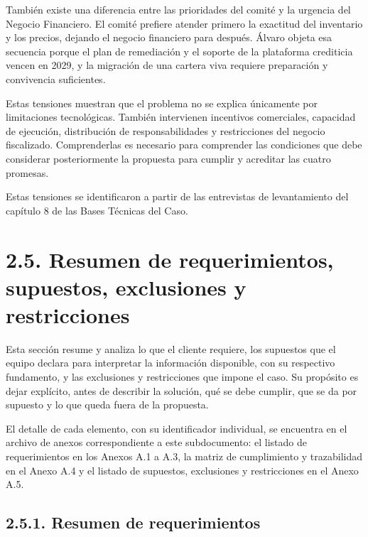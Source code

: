\documentclass[11pt]{article}
\begin{document}
También existe una diferencia entre las prioridades del comité y la urgencia del Negocio Financiero. El comité prefiere atender primero la exactitud del inventario y los precios, dejando el negocio financiero para después. Álvaro objeta esa secuencia porque el plan de remediación y el soporte de la plataforma crediticia vencen en 2029, y la migración de una cartera viva requiere preparación y convivencia suficientes.

Estas tensiones muestran que el problema no se explica únicamente por limitaciones tecnológicas. También intervienen incentivos comerciales, capacidad de ejecución, distribución de responsabilidades y restricciones del negocio fiscalizado. Comprenderlas es necesario para comprender las condiciones que debe considerar posteriormente la propuesta para cumplir y acreditar las cuatro promesas.

Estas tensiones se identificaron a partir de las entrevistas de levantamiento del capítulo 8 de las Bases Técnicas del Caso.

\section{2.5. Resumen de requerimientos, supuestos, exclusiones y restricciones}\label{resumen-de-requerimientos-supuestos-exclusiones-y-restricciones}

Esta sección resume y analiza lo que el cliente requiere, los supuestos que el equipo declara para interpretar la información disponible, con su respectivo fundamento, y las exclusiones y restricciones que impone el caso. Su propósito es dejar explícito, antes de describir la solución, qué se debe cumplir, que se da por supuesto y lo que queda fuera de la propuesta. 

El detalle de cada elemento, con su identificador individual, se encuentra en el archivo de anexos correspondiente a este subdocumento: el listado de requerimientos en los Anexos A.1 a A.3, la matriz de cumplimiento y trazabilidad en el Anexo A.4 y el listado de supuestos, exclusiones y restricciones en el Anexo A.5.

\subsection{2.5.1. Resumen de requerimientos}\label{resumen-de-requerimientos}
\end{document}
